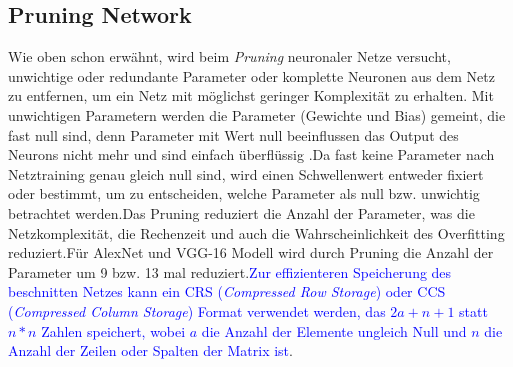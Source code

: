 \documentclass[12pt,a4paper]{scrartcl}
\numberwithin{equation}{section}
\begin{document}
\subsection{Pruning Network}
Wie oben schon erwähnt, wird beim \textit{Pruning} neuronaler Netze versucht, unwichtige oder redundante Parameter oder komplette Neuronen aus dem Netz zu entfernen, um ein Netz mit möglichst geringer Komplexität zu erhalten. Mit unwichtigen Parametern werden die Parameter (Gewichte und Bias) gemeint, die fast null sind, denn Parameter mit Wert null beeinflussen das Output des Neurons nicht mehr und sind einfach überflüssig .Da fast keine Parameter nach Netztraining genau gleich null sind, wird einen Schwellenwert entweder fixiert oder bestimmt, um zu entscheiden, welche Parameter als null bzw. unwichtig betrachtet werden.Das Pruning reduziert die Anzahl der Parameter, was die Netzkomplexität, die Rechenzeit und auch die Wahrscheinlichkeit des Overfitting reduziert.Für AlexNet und VGG-16 Modell wird durch Pruning die Anzahl der Parameter um 9 bzw. 13 mal reduziert\cite{5}.\textcolor{blue}{Zur effizienteren Speicherung des beschnitten Netzes kann ein CRS (\textit{Compressed Row Storage}) oder CCS (\textit{Compressed Column Storage}) Format verwendet werden, das $ 2a+n+1 $ statt $ n*n $ Zahlen speichert, wobei $ a $ die Anzahl der Elemente ungleich Null und $ n $ die Anzahl der Zeilen oder Spalten der Matrix ist}. \\
\end{document}
